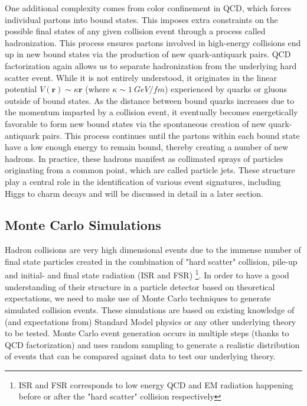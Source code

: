 One additional complexity comes from color confinement in QCD, which forces individual partons into bound states. 
This imposes extra constraints on the possible final states of any given collision event through a process called 
hadronization. This process ensures partons involved in high-energy collisions end up in new bound states via the 
production of new quark-antiquark pairs. QCD factorization again allows us to separate hadronization from the 
underlying hard scatter event. While it is not entirely understood, it originates in the linear potential 
$V(\mathbf{r}) \sim \kappa\mathbf{r}$ (where $\kappa \sim 1\ GeV/fm$) experienced by quarks or gluons outside 
of bound states. As the distance between bound quarks increases due to the momentum imparted by a collision 
event, it eventually becomes energetically favorable to form new bound states via the spontaneous creation of new 
quark-antiquark pairs. This process continues until the partons within each bound state have a low enough energy 
to remain bound, thereby creating a number of new hadrons. In practice, these hadrons manifest as collimated 
sprays of particles originating from a common point, which are called particle jets. These structure play a central role 
in the identification of various event signatures, including Higgs to charm decays and will be discussed in detail 
in a later section.

\subsection{Monte Carlo Simulations}

Hadron collisions are very high dimensional events due to the immense number of final state particles created 
in the combination of "hard scatter" collision, pile-up and initial- and final state radiation (ISR and FSR)
\footnote{ISR and FSR corresponds to low energy QCD and EM radiation happening before or after the "hard scatter" 
collision respectively}. In order to have a good understanding of their structure in a particle detector based on 
theoretical expectations, we need to make use of Monte Carlo techniques to generate simulated collision events. 
These simulations are based on existing knowledge of (and expectations from) Standard Model physics or any 
other underlying theory to be tested. Monte Carlo event generation occurs in multiple steps (thanks to QCD 
factorization) and uses random sampling to generate a realistic distribution of events that can be compared 
against data to test our underlying theory. \par

